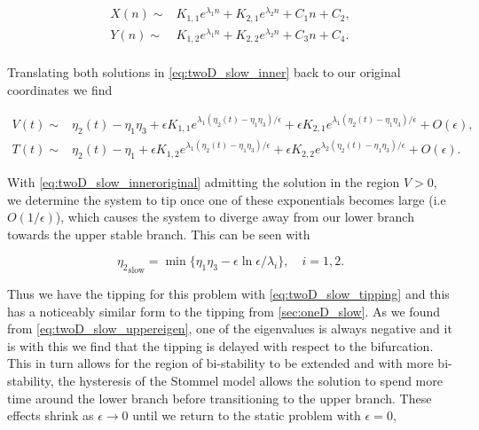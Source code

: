 \begin{equation}\label{eq:twoD_slow_inner}
\begin{aligned}
X(n)\sim& K_{1,1}e^{\lambda_1 n}+K_{2,1}e^{\lambda_2 n}+C_1 n+C_2,\\
Y(n)\sim& K_{1,2}e^{\lambda_1 n}+K_{2,2}e^{\lambda_2 n}+C_3 n+C_4.\\
\end{aligned}
\end{equation}

Translating both solutions in \eqref{eq:twoD_slow_inner} back to our original coordinates we find

\begin{equation}\label{eq:twoD_slow_inneroriginal}
\begin{aligned}
V(t)\sim&  \eta_2(t)-\eta_1\eta_3+ \epsilon K_{1,1}e^{\lambda_1(\eta_2(t)-\eta_1\eta_3)/\epsilon}+\epsilon K_{2,1}e^{\lambda_1(\eta_2(t)-\eta_1\eta_3)/\epsilon}+O(\epsilon),\\
T(t)\sim& \eta_2(t)-\eta_1+ \epsilon K_{1,2}e^{\lambda_1 (\eta_2(t)-\eta_1\eta_3)/\epsilon}+\epsilon K_{2,2}e^{\lambda_2 (\eta_2(t)-\eta_1\eta_3)/\epsilon}+O(\epsilon).
\end{aligned}
\end{equation}

With \eqref{eq:twoD_slow_inneroriginal} admitting the solution in the region $V>0$, we determine the system to tip once one of these exponentials becomes large (i.e $O(1/\epsilon)$), which causes the system to diverge away from our lower branch towards the upper stable branch. This can be seen with

\begin{equation}\label{eq:twoD_slow_tipping}
{\eta_2}_{\text{slow}}= \min\{\eta_1\eta_3-\epsilon\ln\epsilon/\lambda_i\},\quad i=1,2.
\end{equation}

Thus we have the tipping for this problem with \eqref{eq:twoD_slow_tipping} and this has a noticeably similar form to the tipping from \autoref{sec:oneD_slow}. As we found from \eqref{eq:twoD_slow_uppereigen}, one of the eigenvalues is always negative and it is with this we find that the tipping is delayed with respect to the bifurcation. This in turn allows for the region of bi-stability to be extended and with more bi-stability, the hysteresis of the Stommel model allows the solution to spend more time around the lower branch before transitioning to the upper branch. These effects shrink as $\epsilon\to 0$ until we return to the static problem with $\epsilon=0$,

